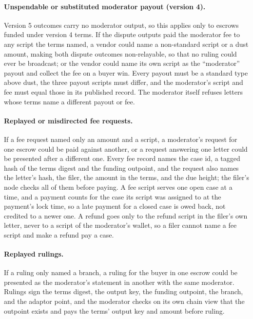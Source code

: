 \paragraph{Unspendable or substituted moderator payout (version 4).} Version 5 outcomes carry no moderator output, so this applies only to escrows funded under version 4 terms. If the dispute outputs paid the moderator fee to any script the terms named, a vendor could name a non-standard script or a dust amount, making both dispute outcomes non-relayable, so that no ruling could ever be broadcast; or the vendor could name its own script as the ``moderator'' payout and collect the fee on a buyer win. Every payout must be a standard type above dust, the three payout scripts must differ, and the moderator's script and fee must equal those in its published record. The moderator itself refuses letters whose terms name a different payout or fee.

\paragraph{Replayed or misdirected fee requests.} If a fee request named only an amount and a script, a moderator's request for one escrow could be paid against another, or a request answering one letter could be presented after a different one. Every fee record names the case id, a tagged hash of the terms digest and the funding outpoint, and the request also names the letter's hash, the filer, the amount in the terms, and the due height; the filer's node checks all of them before paying. A fee script serves one open case at a time, and a payment counts for the case its script was assigned to at the payment's lock time, so a late payment for a closed case is owed back, not credited to a newer one. A refund goes only to the refund script in the filer's own letter, never to a script of the moderator's wallet, so a filer cannot name a fee script and make a refund pay a case.

\paragraph{Replayed rulings.} If a ruling only named a branch, a ruling for the buyer in one escrow could be presented as the moderator's statement in another with the same moderator. Rulings sign the terms digest, the output key, the funding outpoint, the branch, and the adaptor point, and the moderator checks on its own chain view that the outpoint exists and pays the terms' output key and amount before ruling.

